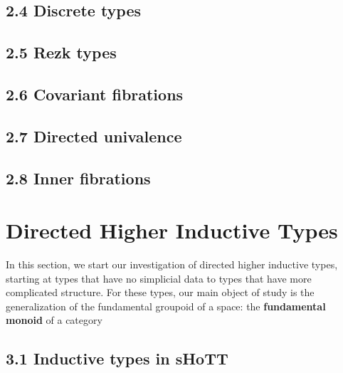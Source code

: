 \documentclass{article}
\theoremstyle{named}
\theoremstyle{remark}
\theoremstyle{definition}
\begin{document}
\subsection*{2.4 Discrete types}

\setcounter{theorem}{0}

\subsection*{2.5 Rezk types}

\setcounter{theorem}{0}

\subsection*{2.6 Covariant fibrations}

\setcounter{theorem}{0}

\subsection*{2.7 Directed univalence}

\setcounter{theorem}{0}


\subsection*{2.8 Inner fibrations}

\setcounter{theorem}{0}



\section{Directed Higher Inductive Types}
In this section, we start our investigation of directed higher inductive types, starting at types that have no simplicial data
to types that have more complicated structure. For these types, our main object of study is the generalization of the fundamental groupoid 
of a space: the \textbf{fundamental monoid} of a category
\subsection*{3.1 Inductive types in sHoTT}

\end{document}
